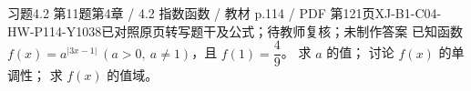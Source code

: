 \par\noindent\begin{minipage}{\linewidth}
\begin{bankitem}{习题4.2 第11题}{第4章 / 4.2 指数函数 / 教材 p.114 / PDF 第121页}{XJ-B1-C04-HW-P114-Y1038}{已对照原页转写题干及公式；待教师复核；未制作答案}
已知函数 $f(x)=a^{|3x-1|}\ (a>0,\ a\ne1)$，且 $f(1)=\dfrac49$。
求 $a$ 的值；
讨论 $f(x)$ 的单调性；
求 $f(x)$ 的值域。
\end{bankitem}
\end{minipage}\par\medskip

